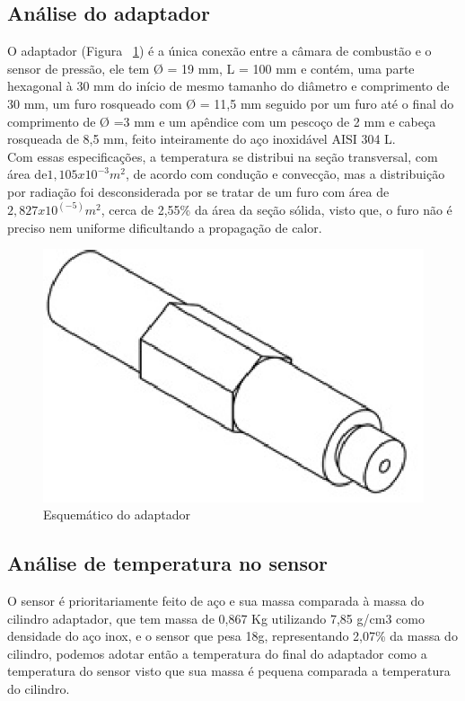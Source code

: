 \subsection{Análise do adaptador}
O adaptador (Figura ~\ref{fig2tc}) é a única conexão entre a câmara de combustão e o sensor de pressão, ele tem Ø = 19 mm, L = 100 mm e contém, uma parte hexagonal à 30 mm do início de mesmo tamanho do diâmetro e comprimento de 30 mm, um furo rosqueado com Ø = 11,5 mm seguido por um furo até o final do comprimento de Ø =3 mm e um apêndice com um pescoço de 2 mm e cabeça rosqueada de 8,5 mm, feito inteiramente do aço inoxidável AISI 304 L.\\
Com essas especificações, a temperatura se distribui na seção transversal, com área de$ 1,105 x10^{-3}m^2$, de acordo com condução e convecção, mas a distribuição por radiação foi desconsiderada por se tratar de um furo com área de $2,827 x 10^{(-5)}m^2$, cerca de 2,55\% da área da seção sólida, visto que, o furo não é preciso nem uniforme dificultando a propagação de calor.
\begin{figure}[!htb]                  
	\centering                          
	\includegraphics[scale=1]{figuras/Figura2tc.eps}
	\caption{Esquemático do adaptador} \label{fig2tc}              
\end{figure}
\subsection{Análise de temperatura no sensor}
O sensor é prioritariamente feito de aço e sua massa comparada à massa do cilindro adaptador, que tem massa de 0,867 Kg utilizando 7,85 g/cm3 como densidade do aço inox, e o sensor que pesa 18g, representando 2,07\% da massa do cilindro, podemos adotar então a temperatura do final do adaptador como a temperatura do sensor visto que sua massa é pequena comparada a temperatura do cilindro.
